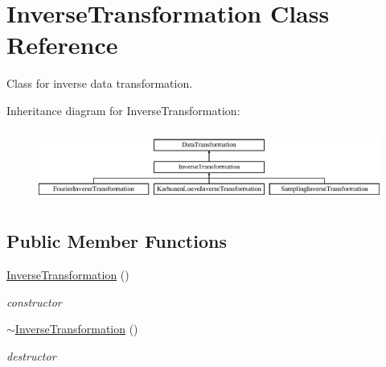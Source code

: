 \section{Inverse\+Transformation Class Reference}
\label{classPecos_1_1InverseTransformation}


Class for inverse data transformation.  


Inheritance diagram for Inverse\+Transformation\+:\begin{figure}[H]
\begin{center}
\leavevmode
\includegraphics[height=2.372881cm]{classPecos_1_1InverseTransformation}
\end{center}
\end{figure}
\subsection*{Public Member Functions}
\begin{DoxyCompactItemize}
\item 
\hyperlink{classPecos_1_1InverseTransformation_a2f26b12650822873ec0fd05d7fdcd53c}{Inverse\+Transformation} ()\label{classPecos_1_1InverseTransformation_a2f26b12650822873ec0fd05d7fdcd53c}

\begin{DoxyCompactList}\small\item\em constructor \end{DoxyCompactList}\item 
\hyperlink{classPecos_1_1InverseTransformation_af364ba2a4996b223d946a4e19cd7bc4f}{$\sim$\+Inverse\+Transformation} ()\label{classPecos_1_1InverseTransformation_af364ba2a4996b223d946a4e19cd7bc4f}

\begin{DoxyCompactList}\small\item\em destructor \end{DoxyCompactList}\end{DoxyCompactItemize}
